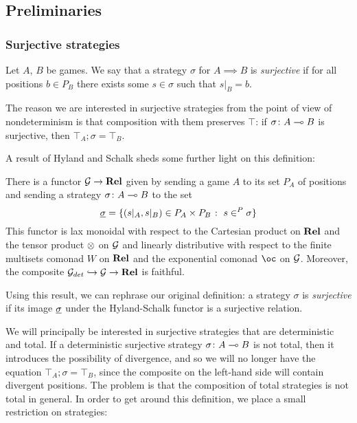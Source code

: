 \documentclass{article}
\begin{document}
\subsection{Preliminaries}

\subsubsection{Surjective strategies}

Let $A$, $B$ be games.  
We say that a strategy $\sigma$ for $A\implies B$ is \emph{surjective} if for all positions $b\in P_B$ there exists some $s\in \sigma$ such that $s\vert_B=b$.  

The reason we are interested in surjective strategies from the point of view of nondeterminism is that composition with them preserves $\top$: if $\sigma\colon A\multimap B$ is surjective, then $\top_A;\sigma=\top_B$.  

A result of Hyland and Schalk \cite{hylandSchalkGames} sheds some further light on this definition:

\begin{proposition}
  There is a functor $\mathcal G\to{\normalfont\textbf{Rel}}$ given by sending a game $A$ to its set $P_A$ of positions and sending a strategy $\sigma\colon A\multimap B$ to the set
  \[
    \underline{\sigma} = \{(s\vert_A,s\vert_B)\in P_A\times P_B\;\colon\; s\in^P\sigma\}
    \]
  This functor is lax monoidal with respect to the Cartesian product on ${\normalfont\textbf{Rel}}$ and the tensor product $\otimes$ on $\mathcal G$ and linearly distributive with respect to the finite multisets comonad $W$ on ${\normalfont\textbf{Rel}}$ and the exponential comonad $\oc$ on $\mathcal G$.  
  Moreover, the composite $\mathcal G_{det}\hookrightarrow\mathcal G\to{\normalfont\textbf{Rel}}$ is faithful.  
\end{proposition}

Using this result, we can rephrase our original definition: a strategy $\sigma$ is \emph{surjective} if its image $\underline{\sigma}$ under the Hyland-Schalk functor is a surjective relation. 

We will principally be interested in surjective strategies that are deterministic and total.  
If a deterministic surjective strategy $\sigma\colon A\multimap B$ is not total, then it introduces the possibility of divergence, and so we will no longer have the equation $\top_A;\sigma=\top_B$, since the composite on the left-hand side will contain divergent positions.  
The problem is that the composition of total strategies is not total in general.  
In order to get around this definition, we place a small restriction on strategies:
\end{document}
